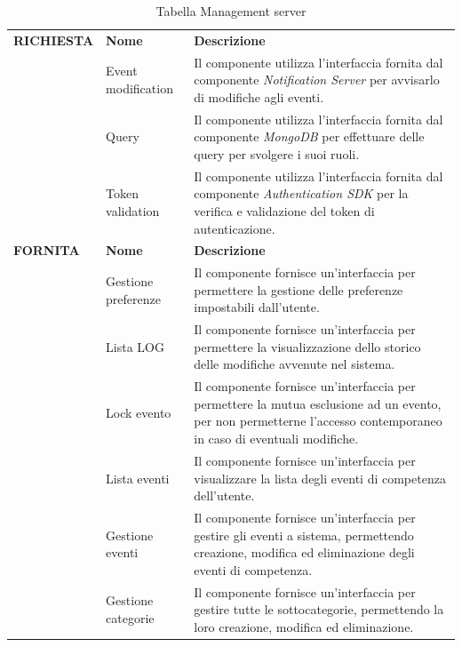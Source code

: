 \documentclass{article}
\begin{document}
\begin{table}[htbp]
    \centering
    \renewcommand{\arraystretch}{1.3} %
    \begin{tabularx}{\textwidth}{| l | l | X |}
        \Xhline{2pt}
        \textbf{RICHIESTA} & \textbf{Nome} & \textbf{Descrizione} \\
        \Xhline{2pt}
         & Event modification & Il componente utilizza l'interfaccia fornita dal componente \textit{Notification Server} per avvisarlo di modifiche agli eventi. \\
        \hline
         & Query & Il componente utilizza l'interfaccia fornita dal componente \textit{MongoDB} per effettuare delle query per svolgere i suoi ruoli. \\
        \hline
         & Token validation & Il componente utilizza l'interfaccia fornita dal componente \textit{Authentication SDK} per la verifica e validazione del token di autenticazione. \\
        \Xhline{2pt}
        \textbf{FORNITA} & \textbf{Nome} & \textbf{Descrizione} \\
        \Xhline{2pt}
         & Gestione preferenze & Il componente fornisce un'interfaccia per permettere la gestione delle preferenze impostabili dall'utente. \\
        \hline
         & Lista LOG & Il componente fornisce un'interfaccia per permettere la visualizzazione dello storico delle modifiche avvenute nel sistema. \\
        \hline
        & Lock evento & Il componente fornisce un'interfaccia per permettere la mutua esclusione ad un evento, per non permetterne l'accesso contemporaneo in caso di eventuali modifiche. \\
        \hline
        & Lista eventi & Il componente fornisce un'interfaccia per visualizzare la lista degli eventi di competenza dell'utente. \\
        \hline
        & Gestione eventi & Il componente fornisce un'interfaccia per gestire gli eventi a sistema, permettendo creazione, modifica ed eliminazione degli eventi di competenza. \\
        \hline
        & Gestione categorie & Il componente fornisce un'interfaccia per gestire tutte le sottocategorie, permettendo la loro creazione, modifica ed eliminazione. \\
        \hline
    \end{tabularx}
    \caption{Tabella Management server}
\end{table}
\end{document}
